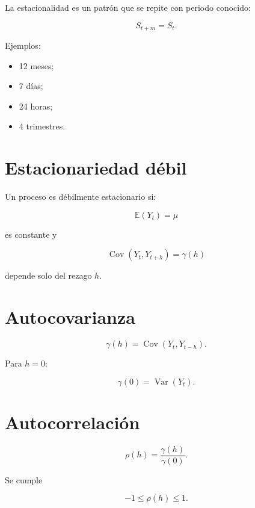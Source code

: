 \documentclass[
  spanish,
  10.5pt,
  letterpaper,
  DIV=11,
  numbers=noendperiod,
  oneside,
  open=any]{scrreprt}
\providecommand{\tightlist}{%
  \setlength{\itemsep}{0pt}\setlength{\parskip}{0pt}}
\theoremstyle{definition}
\theoremstyle{definition}
\theoremstyle{plain}
\theoremstyle{remark}
\begin{document}

La estacionalidad es un patrón que se repite con periodo conocido:

\[
S_{t+m}=S_t.
\]

Ejemplos:

\begin{itemize}
\tightlist
\item
  12 meses;
\item
  7 días;
\item
  24 horas;
\item
  4 trimestres.
\end{itemize}

\section*{Estacionariedad débil}\label{estacionariedad-duxe9bil}


Un proceso es débilmente estacionario si:

\[
\mathbb{E}(Y_t)=\mu
\]

es constante y

\[
\operatorname{Cov}(Y_t,Y_{t+h})
=
\gamma(h)
\]

depende solo del rezago \(h\).

\section*{Autocovarianza}\label{autocovarianza}


\[
\gamma(h)
=
\operatorname{Cov}(Y_t,Y_{t-h}).
\]

Para \(h=0\):

\[
\gamma(0)=\operatorname{Var}(Y_t).
\]

\section*{Autocorrelación}\label{autocorrelaciuxf3n}


\[
\rho(h)
=
\frac{\gamma(h)}{\gamma(0)}.
\]

Se cumple

\[
-1\leq\rho(h)\leq1.
\]
\end{document}
